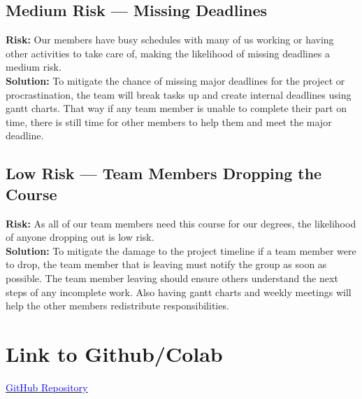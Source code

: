 \documentclass{article} %
\begin{document}
\subsection{Medium Risk — Missing Deadlines}
\textbf{Risk:} Our members have busy schedules with many of us working or having other activities to take care of, making the likelihood of missing deadlines a medium risk. \\
\textbf{Solution:} To mitigate the chance of missing major deadlines for the project or procrastination, the team will break tasks up and create internal deadlines using gantt charts. That way if any team member is unable to complete their part on time, there is still time for other members to help them and meet the major deadline.

\subsection{Low Risk — Team Members Dropping the Course}
\textbf{Risk:} As all of our team members need this course for our degrees, the likelihood of anyone dropping out is low risk. \\
\textbf{Solution:} To mitigate the damage to the project timeline if a team member were to drop, the team member that is leaving must notify the group as soon as possible. The team member leaving should ensure others understand the next steps of any incomplete work. Also having gantt charts and weekly meetings will help the other members redistribute responsibilities.

\hypersetup{
    colorlinks=true,
    linkcolor=blue,
    urlcolor=blue
}

\section{Link to Github/Colab}
\noindent
\href{https://github.com/shill7/APS360_Project}{\underline{\textcolor{blue}{GitHub Repository}}}

\label{last_page}



\end{document}
